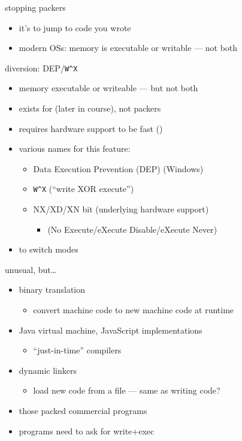 
\begin{frame}{stopping packers}
    \begin{itemize}
    \item it's  to jump to code you wrote
    \item modern OSs: memory is executable or writable --- not both
    \end{itemize}
\end{frame}

\begin{frame}{diversion: DEP/{\tt W\textasciicircum X}}
    \begin{itemize}
    \item memory executable or writeable --- but not both
    \item exists for  (later in course), not packers
    \item requires hardware support to be fast ()
    \item various names for this feature:
        \begin{itemize}
        \item Data Execution Prevention (DEP) (Windows)
        \item {\tt W\textasciicircum X} (``write XOR execute'')
        \item NX/XD/XN bit  (underlying hardware support)
            \begin{itemize}
            \item (No Execute/eXecute Disable/eXecute Never)
            \end{itemize}
        \end{itemize}
    \item {} to switch modes
    \end{itemize}
\end{frame}

\begin{frame}{unusual, but\ldots}
    \begin{itemize}
    \item binary translation
        \begin{itemize}
        \item convert machine code to new machine code at runtime
        \end{itemize}
    \item Java virtual machine, JavaScript implementations
        \begin{itemize}
        \item ``just-in-time'' compilers
        \end{itemize}
    \item dynamic linkers
        \begin{itemize}
        \item load new code from a file --- same as writing code?
        \end{itemize}
    \item those packed commercial programs
    \vspace{.5cm}
    \item programs need to  ask for write+exec
    \end{itemize}
\end{frame}

